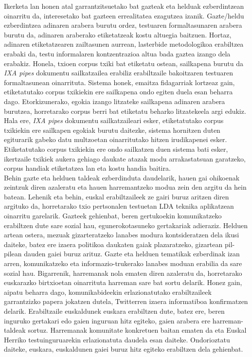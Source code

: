 \documentclass[information,article,submit,moreauthors,pdftex,10pt,a4paper]{Definitions/mdpi}
\begin{document}
\indent Ikerketa lan honen atal garrantzitsuetako bat gazteak eta helduak ezberdintzean oinarritu da, interesetako bat gazteen errealitatea ezagutzea izanik. Gazte/heldu ezberdintzea adinaren arabera burutu ordez, testuaren formaltasunaren arabera burutu da, adinaren araberako etiketatzeak kostu altuegia baitzuen. Hortaz, adinaren etiketatzearen zailtasunen aurrean, lasterbide metodologikoa erabiltzea erabaki da, testu informalaren kontzentrazioa altua bada gaztea izango dela erabakiz. Honela, txioen corpus txiki bat etiketatu ostean, sailkapena burutu da \textit{IXA pipes} dokumentu sailkatzailea erabiliz erabiltzaile bakoitzaren testuaren formaltasunean oinarrituta. Sistema honek, emaitza fidagarriak lortzeaz gain, etiketatutako corpus txikiekin ere sailkapena ondo egiten duela esan beharra dago. Etorkizunerako, egokia izango litzateke sailkapena adinaren arabera burutzea, horretarako corpus berri bat etiketatu beharko litzatekeela argi edukiz. Hala ere, \textit{IXA pipes} dokumentu sailkatzaileari esker, etiketatutako corpus txikiekin ere sailkapen egokiak burutu daitezke, sistema hornitzen duten egiturarik gabeko datu multzoetan oinarritutako hitzen irudikapenei esker. Etiketatutako corpus txikiekin ere ondo sailkatzen duen sistema bati esker, ikertzaile txikiek aukera gehiago daukate atazak modu arrakastatsuan garatzeko, corpus handiak etiketatzea lan eta kostu handia baitira.\\
\indent Behin gazte eta helduen taldeak ezberdinduta daudelarik, hauen gai ohikoenak zeintzuk diren azaleratu eta hauen harremantzeko modua zein den argitu da hein batean. Lehenik eta behin, euskal erabiltzaileek ze gairi buruz aritzen diren argituko da, horretarako txio pertsonalen testuetan LDA teknika aplikatzean oinarritu garelarik. Gazteek gehienbat, beren gertukoekin komunikatzeko erabiltzen dute sare sozial hau, egunerokotasuneko gertakariak adieraziz. Helduen artean ostera, mezuak gizarteratzeko lanabes modura kontsideratzen dela ikusi daiteke, batez ere izaera politikoa daukaten gaiak plazaratzeko, gizartean pil-pilean dauden gaiei buruz arituz. Gazte eta helduen tematikak ezberdinak izan arren, komunikatzeko eta informazio-trukerako lanabes moduan erabilia da sare sozial hau. Bigarrenik, harremanak nola ematen diren azaleratu da, horretarako euskarazko birtxioetan oinarrituta harreman sare bat sortu delarik. Honez gain, aipatu beharra dago, komunikabideekin erlazionatutako erabiltzaileek garrantzizko papera jokatzen dutela, Twitterren izaera informatiboa konfirmatzen delarik. Erabiltzaile euskaldunek euskara erabiltzen dute, batez ere, beren inguruko gertakari edo gaien inguruan hitz egiteko, gaien arabera ere harreman-taldeak sortuz. Harremanak komunitate konkretuen baitan ematen da eta Euskal Herriko testuinguruarekin erlazionatuta daudela esan daiteke. Ondorioztatu daiteke, euskara, euskaldunen gaiei buruz hitz egiteko erabiltzen dela gehienbat.\\
\end{document}
